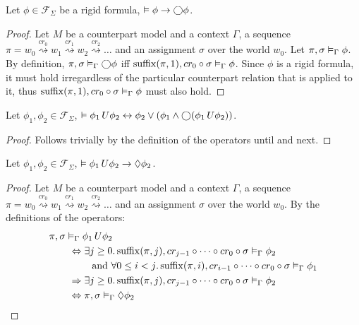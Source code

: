 \begin{lemma}\label{lem:nextintro}
  Let $\phi \in \mathcal{F}_\Sigma$ be a rigid formula, $\vDash \phi \to \bigcirc{\phi}$.
\end{lemma}
\begin{proof}
  Let $M$ be a counterpart model and a context $\Gamma$, a sequence $\pi = w_0 \overset{cr_0}{\rightsquigarrow} w_1
  \overset{cr_1}{\rightsquigarrow} w_2 \overset{cr_2}{\rightsquigarrow} \ldots$ and an assignment $\sigma$ over the
  world $w_0$.
  Let ${\pi}, {\sigma} \vDash_{\Gamma} {\phi}$. By definition, ${\pi}, {\sigma} \vDash_{\Gamma} {\bigcirc{\phi}}$ iff
  ${\operatorname{suffix}(\pi,1)}, {cr_0 \circ \sigma} \vDash_{\Gamma} {\phi}$.
  Since $\phi$ is a rigid formula, it must hold irregardless of the particular counterpart relation that is applied to
  it, thus ${\operatorname{suffix}(\pi,1)}, {cr_0 \circ \sigma} \vDash_{\Gamma} {\phi}$ must also hold.
\end{proof}

\begin{lemma}\label{lem:untilexp}
  Let $\phi_1, \phi_2 \in \mathcal{F}_\Sigma$, $\vDash {\phi_1}\,U {\phi_2} \leftrightarrow \phi_2 \lor (\phi_1 \land
  \bigcirc{({\phi_1}\,U {\phi_2})})$.
\end{lemma}
\begin{proof}
  Follows trivially by the definition of the operators until and next.
\end{proof}

\begin{lemma}\label{lem:untileventually}
  Let $\phi_1, \phi_2 \in \mathcal{F}_\Sigma$, $\vDash {\phi_1}\,U {\phi_2} \to \Diamond{\phi_2}$.
\end{lemma}
\begin{proof}
  Let $M$ be a counterpart model and a context $\Gamma$, a sequence $\pi = w_0 \overset{cr_0}{\rightsquigarrow} w_1
  \overset{cr_1}{\rightsquigarrow} w_2 \overset{cr_2}{\rightsquigarrow} \ldots$ and an assignment $\sigma$ over the
  world $w_0$.
  By the definitions of the operators:
  \begin{align*}
    &{\pi}, {\sigma} \vDash_{\Gamma} {{\phi_1}\,U {\phi_2}} \\
    &\qquad\Leftrightarrow \exists {j \geq 0} \ldotp {{\operatorname{suffix}(\pi,j)}, {cr_{j-1} \circ \cdots \circ cr_0 \circ \sigma} \vDash_{\Gamma} {\phi_2}} \\
    &\qquad\qquad\text{ and } \forall {0 \leq i < j} \ldotp {{\operatorname{suffix}(\pi,i)}, {cr_{i-1} \circ \cdots \circ cr_0 \circ
    \sigma} \vDash_{\Gamma} {\phi_1}} \\
    &\qquad\Rightarrow \exists {j \geq 0} \ldotp {{\operatorname{suffix}(\pi,j)}, {cr_{j-1} \circ \cdots \circ cr_0 \circ \sigma} \vDash_{\Gamma} {\phi_2}} \\
    &\qquad\Leftrightarrow {\pi}, {\sigma} \vDash_{\Gamma} {\Diamond{\phi_2}}
  \end{align*}
\end{proof}


